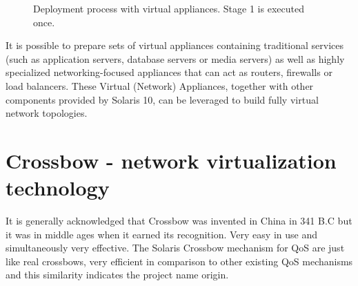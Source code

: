\documentclass[11pt]{book}
\begin{document}
        \begin{figure}[H]
          \begin{center}
          \end{center}

          \caption{Deployment process with virtual appliances. Stage 1 is executed once.}
        \end{figure}

        It is possible to prepare sets of virtual appliances containing traditional services (such as application
        servers, database servers or media servers) as well as highly specialized networking-focused appliances that can
        act as routers, firewalls or load balancers. These Virtual (Network) Appliances, together with other components
        provided by Solaris 10,  can be leveraged to build fully virtual network topologies.


    \section{Crossbow - network virtualization technology}


                It is generally acknowledged that Crossbow was invented in China in 341 B.C but it was in middle ages when 
                it earned its recognition. Very easy in use and simultaneously very effective. The Solaris Crossbow mechanism 
                for QoS are just like real crossbows, very efficient in comparison to other existing QoS mechanisms and this
                similarity indicates the project name origin.
\end{document}
